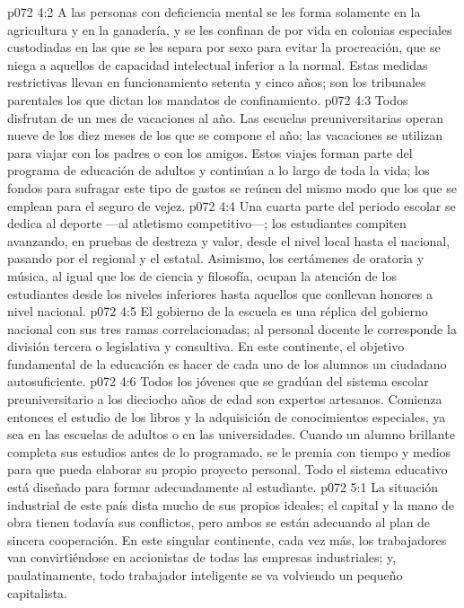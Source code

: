 \vs p072 4:2 \pc A las personas con deficiencia mental se les forma solamente en la agricultura y en la ganadería, y se les confinan de por vida en colonias especiales custodiadas en las que se les separa por sexo para evitar la procreación, que se niega a aquellos de capacidad intelectual inferior a la normal. Estas medidas restrictivas llevan en funcionamiento setenta y cinco años; son los tribunales parentales los que dictan los mandatos de confinamiento.
\vs p072 4:3 \pc Todos disfrutan de un mes de vacaciones al año. Las escuelas preuniversitarias operan nueve de los diez meses de los que se compone el año; las vacaciones se utilizan para viajar con los padres o con los amigos. Estos viajes forman parte del programa de educación de adultos y continúan a lo largo de toda la vida; los fondos para sufragar este tipo de gastos se reúnen del mismo modo que los que se emplean para el seguro de vejez.
\vs p072 4:4 Una cuarta parte del periodo escolar se dedica al deporte ---al atletismo competitivo---; los estudiantes compiten avanzando, en pruebas de destreza y valor, desde el nivel local hasta el nacional, pasando por el regional y el estatal. Asimismo, los certámenes de oratoria y música, al igual que los de ciencia y filosofía, ocupan la atención de los estudiantes desde los niveles inferiores hasta aquellos que conllevan honores a nivel nacional.
\vs p072 4:5 El gobierno de la escuela es una réplica del gobierno nacional con sus tres ramas correlacionadas; al personal docente le corresponde la división tercera o legislativa y consultiva. En este continente, el objetivo fundamental de la educación es hacer de cada uno de los alumnos un ciudadano autosuficiente.
\vs p072 4:6 Todos los jóvenes que se gradúan del sistema escolar preuniversitario a los dieciocho años de edad son expertos artesanos. Comienza entonces el estudio de los libros y la adquisición de conocimientos especiales, ya sea en las escuelas de adultos o en las universidades. Cuando un alumno brillante completa sus estudios antes de lo programado, se le premia con tiempo y medios para que pueda elaborar su propio proyecto personal. Todo el sistema educativo está diseñado para formar adecuadamente al estudiante.
\vs p072 5:1 La situación industrial de este país dista mucho de sus propios ideales; el capital y la mano de obra tienen todavía sus conflictos, pero ambos se están adecuando al plan de sincera cooperación. En este singular continente, cada vez más, los trabajadores van convirtiéndose en accionistas de todas las empresas industriales; y, paulatinamente, todo trabajador inteligente se va volviendo un pequeño capitalista.
